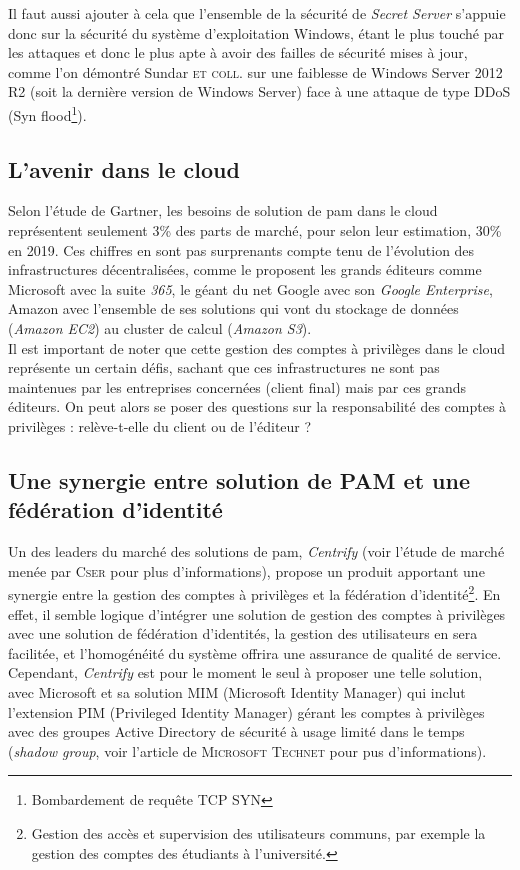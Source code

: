 Il faut aussi ajouter à cela que l'ensemble de la sécurité de \emph{Secret Server} s'appuie donc sur la sécurité du système d'exploitation Windows, étant le plus touché par les attaques et donc le plus apte à avoir des failles de sécurité mises à jour, comme l'on démontré Sundar \textsc{et coll.}\cite{skk} sur une faiblesse de Windows Server 2012 R2 (soit la dernière version de Windows Server) face à une attaque de type DDoS (Syn flood\footnote{Bombardement de requête TCP SYN}).

\subsection{L'avenir dans le cloud}
\label{subsec:avenircloud}

Selon l'étude de Gartner\cite{gar}, les besoins de solution de \gls{pam} dans le cloud représentent seulement 3\% des parts de marché, pour selon leur estimation, 30\% en 2019. Ces chiffres en sont pas surprenants compte tenu de l'évolution des infrastructures décentralisées, comme le proposent les grands éditeurs comme Microsoft avec la suite \emph{365}, le géant du net Google avec son \emph{Google Enterprise}, Amazon avec l'ensemble de ses solutions qui vont du stockage de données (\emph{Amazon EC2}) au cluster de calcul (\emph{Amazon S3}).\\
Il est important de noter que cette gestion des comptes à privilèges dans le cloud représente un certain défis, sachant que ces infrastructures ne sont pas maintenues par les entreprises concernées (client final) mais par ces grands éditeurs. On peut alors se poser des questions sur la responsabilité des comptes à privilèges : relève-t-elle du client ou de l'éditeur ?

\subsection{Une synergie entre solution de PAM et une fédération d'identité}
\label{subsec:syner}

Un des leaders du marché des solutions de \gls{pam}, \emph{Centrify} (voir l'étude de marché menée par \textsc{Cser} \cite{acs} pour plus d'informations), propose un produit apportant une synergie entre la gestion des comptes à privilèges et la fédération d'identité\footnote{Gestion des accès et supervision des utilisateurs communs, par exemple la gestion des comptes des étudiants à l'université.}. En effet, il semble logique d'intégrer une solution de gestion des comptes à privilèges avec une solution de fédération d'identités, la gestion des utilisateurs en sera facilitée, et l’homogénéité du système offrira une assurance de qualité de service. Cependant, \emph{Centrify} est pour le moment le seul à proposer une telle solution, avec Microsoft et sa solution MIM (Microsoft Identity Manager) qui inclut l'extension PIM (Privileged Identity Manager) gérant les comptes à privilèges avec des groupes Active Directory de sécurité à usage limité dans le temps (\emph{shadow group}, voir l'article de \textsc{Microsoft Technet} \cite{mic} pour pus d'informations).

